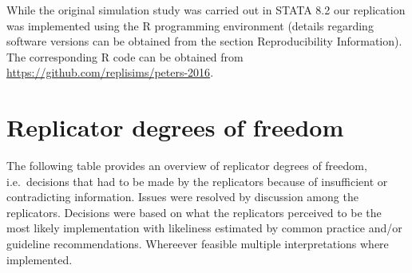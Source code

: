\documentclass[
  english,
  doc,floatsintext,draftall]{apa6}
\begin{document}
While the original simulation study was carried out in STATA 8.2 our replication was implemented
using the R programming environment (details regarding software versions can be obtained from the section Reproducibility Information).
The corresponding R code can be obtained from \url{https://github.com/replisims/peters-2016}.

\hypertarget{replicator-degrees-of-freedom}{%
\section{Replicator degrees of freedom}\label{replicator-degrees-of-freedom}}

The following table provides an overview of replicator degrees of freedom,
i.e.~decisions that had to be made by the replicators because of insufficient or contradicting information.
Issues were resolved by discussion among the replicators.
Decisions were based on what the replicators perceived to be the most likely implementation with likeliness estimated by common practice and/or guideline recommendations.
Whereever feasible multiple interpretations where implemented.
\end{document}
